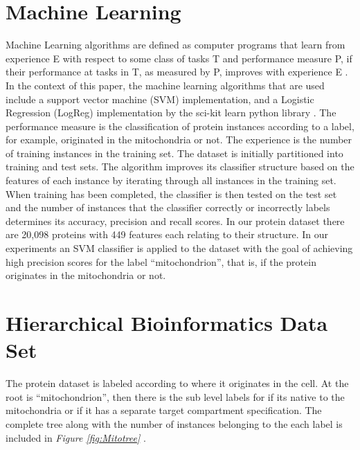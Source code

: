 \documentclass[ms]{nuthesis}
\begin{document}
\section{Machine Learning}
\par Machine Learning algorithms are defined as computer programs that learn from experience E
with respect to some class of tasks T and performance measure P, if their performance at
tasks in T, as measured by P, improves with experience E \cite{mitchell}. In the context of this paper,
the machine learning algorithms that are used include a support vector machine (SVM) implementation, and
a Logistic Regression (LogReg) implementation by the sci-kit learn python library \cite{scikit-learn}.
The performance measure is the classification of protein instances according to a
label, for example, originated in the mitochondria or not.  The experience is the number of
training instances in the training set. The dataset is initially partitioned into training
and test sets. The algorithm improves its classifier structure based on the features of
each instance by iterating through all instances in the training set. When training has
been completed, the classifier is then tested on the test set and the number of instances
that the classifier correctly or incorrectly labels determines its accuracy, precision
and recall scores. In our protein dataset there are 20,098 proteins with 449 features each
relating to their structure. In our experiments an SVM classifier is applied to the dataset
with the goal of achieving high precision scores for the label “mitochondrion”, that is,
if the protein originates in the mitochondria or not.


\section{Hierarchical Bioinformatics Data Set}
\par The protein dataset is labeled according to where it originates in the cell.
At the root is “mitochondrion”, then there is the sub level labels for if its native
to the mitochondria or if it has a separate target compartment specification. The complete
tree along with the number of instances belonging to the each label is included in \textit{Figure \ref{fig:Mitotree} }.
\end{document}
